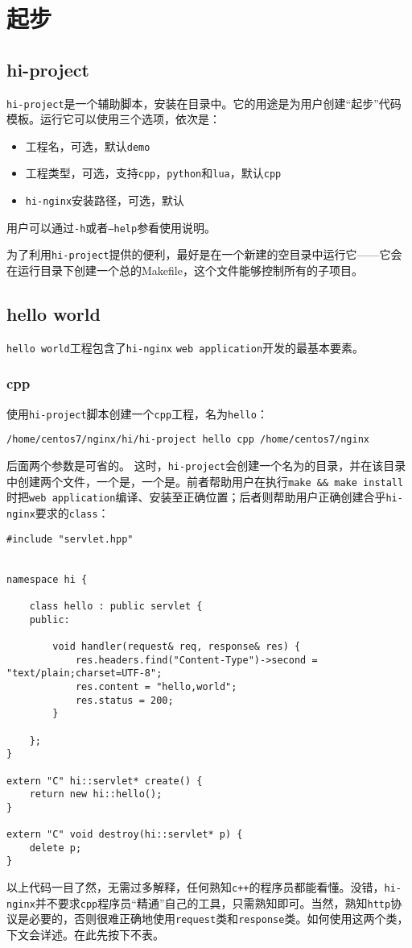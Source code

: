 \section{起步}
\subsection{hi-project}
\texttt{hi-project}是一个辅助脚本，安装在目录中。它的用途是为用户创建“起步”代码模板。运行它可以使用三个选项，依次是：
\begin{itemize}
\item 工程名，可选，默认\texttt{demo}
\item 工程类型，可选，支持\texttt{cpp}，\texttt{python}和\texttt{lua}，默认\texttt{cpp}
\item \texttt{hi-nginx}安装路径，可选，默认
\end{itemize}
用户可以通过\texttt{-h}或者\texttt{--help}参看使用说明。

为了利用\texttt{hi-project}提供的便利，最好是在一个新建的空目录中运行它——它会在运行目录下创建一个总的Makefile，这个文件能够控制所有的子项目。

\subsection{hello world}
\texttt{hello world}工程包含了\texttt{hi-nginx} \texttt{web application}开发的最基本要素。
\subsubsection{cpp}
使用\texttt{hi-project}脚本创建一个\texttt{cpp}工程，名为\texttt{hello}：
\begin{lstlisting}
/home/centos7/nginx/hi/hi-project hello cpp /home/centos7/nginx
\end{lstlisting}
后面两个参数是可省的。
这时，\texttt{hi-project}会创建一个名为的目录，并在该目录中创建两个文件，一个是，一个是。前者帮助用户在执行\texttt{make \&\& make install }时把\texttt{web application}编译、安装至正确位置；后者则帮助用户正确创建合乎\texttt{hi-nginx}要求的\texttt{class}：
\begin{lstlisting}
#include "servlet.hpp"


namespace hi {

    class hello : public servlet {
    public:

        void handler(request& req, response& res) {
            res.headers.find("Content-Type")->second = "text/plain;charset=UTF-8";
            res.content = "hello,world";
            res.status = 200;
        }

    };
}

extern "C" hi::servlet* create() {
    return new hi::hello();
}

extern "C" void destroy(hi::servlet* p) {
    delete p;
}
\end{lstlisting}
以上代码一目了然，无需过多解释，任何熟知\texttt{c++}的程序员都能看懂。没错，\texttt{hi-nginx}并不要求\texttt{cpp}程序员“精通”自己的工具，只需熟知即可。当然，熟知\texttt{http}协议是必要的，否则很难正确地使用\texttt{request}类和\texttt{response}类。如何使用这两个类，下文会详述。在此先按下不表。


